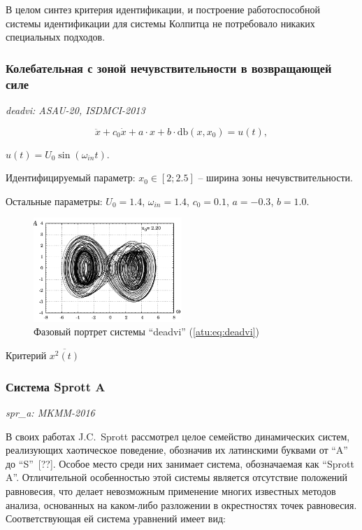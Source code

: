 \documentclass[a4paper,12pt]{article}
\newcommand{\LinkRef}[1]{ \textit{\color{red}#1} }
\begin{document}
В целом синтез критерия идентификации, и построение работоспособной системы идентификации для
системы Колпитца не потребовало никаких специальных подходов.


\FloatBarrier

\subsubsection{Колебательная с зоной нечувствительности в возвращающей силе} %

\LinkRef{
  deadvi: ASAU-20, ISDMCI-2013
}

\begin{equation}
\ddot{x} + c_0 \dot{x} + a \cdot x + b \cdot \mathrm{db}(x,x_0) = u(t),
\label{atu:eq:deadvi}
\end{equation}

$ u(t) = U_0 \sin( \omega_{in} t ) $.

Идентифицируемый параметр:
$ x_0 \in [2;2.5] $ -- ширина зоны нечувствительности.

Остальные параметры:
$U_0 = 1.4$, $\omega_{in} = 1.4$, $c_0=0.1$, $a=-0.3$, $b=1.0$.


\begin{figure}[htb!]
\centerline{\includegraphics[width=0.5\textwidth]{p/cha/deadvi_phase.pdf} }
\caption{Фазовый портрет системы ``deadvi'' (\ref{atu:eq:deadvi})}
\label{atu:f:deadvi_phase}
\end{figure}

Критерий
$\overline{x^2(t)}$


\FloatBarrier
\subsubsection{Система Sprott A}

\LinkRef{
  spr\_a: MKMM-2016
}

В своих работах J.C.~Sprott рассмотрел целое семейство динамических
систем, реализующих хаотическое поведение, обозначив их латинскими буквами
от ``A'' до ``S''~[??]. Особое место среди них
занимает система, обозначаемая как ``Sprott A''. Отличительной особенностью
этой системы является отсутствие положений равновесия, что делает
невозможным применение многих известных методов анализа, основанных на
каком-либо разложении в окрестностях точек равновесия. Соответствующая ей
система уравнений имеет вид:
\end{document}
